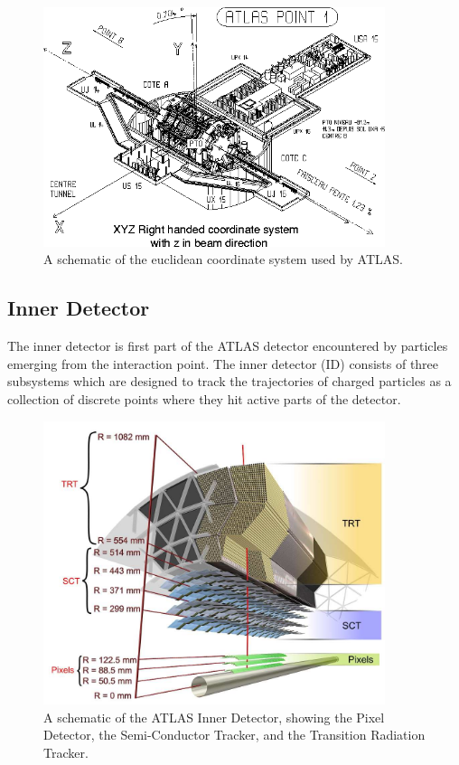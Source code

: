 \begin{figure}
  \begin{center}
    \includegraphics[width=100mm]{figures/atlas/AtlasCoordinateSystem.png}
  \end{center}
  \caption{A schematic of the euclidean coordinate system used by ATLAS.}
  \label{img:AtlasCoordinateSystem}
\end{figure}

\subsection{Inner Detector}
The inner detector is first part of the ATLAS detector encountered by particles emerging from the interaction point.
The inner detector (ID) consists of three subsystems which are designed to track the trajectories of charged particles as a collection of discrete points where they hit active parts of the detector.

\begin{figure}
  \begin{center}
    \includegraphics[width=100mm]{figures/atlas/InnerDetector.jpg}
  \end{center}
  \caption{A schematic of the ATLAS Inner Detector, showing the Pixel Detector, the Semi-Conductor Tracker, and the Transition Radiation Tracker.}
  \label{img:InnerDetector}
\end{figure}


